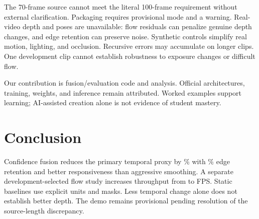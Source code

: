 \documentclass[10pt,twocolumn,letterpaper]{article}
\begin{document}
The 70-frame source cannot meet the literal 100-frame requirement without external clarification. Packaging requires provisional mode and a warning. Real-video depth and poses are unavailable: flow residuals can penalize genuine depth changes, and edge retention can preserve noise. Synthetic controls simplify real motion, lighting, and occlusion. Recursive errors may accumulate on longer clips. One development clip cannot establish robustness to exposure changes or difficult flow.

Our contribution is fusion/evaluation code and analysis. Official architectures, training, weights, and inference remain attributed. Worked examples support learning; AI-assisted creation alone is not evidence of student mastery.

\section{Conclusion}
Confidence fusion reduces the primary temporal proxy by \TemporalGain\% with \EdgeRetention\% edge retention and better responsiveness than aggressive smoothing. A separate development-selected flow study increases throughput from \OriginalFPS{} to \EfficientFPS{} FPS. Static baselines use explicit units and masks. Less temporal change alone does not establish better depth. The demo remains provisional pending resolution of the source-length discrepancy.

\clearpage
{\small


}
\end{document}

